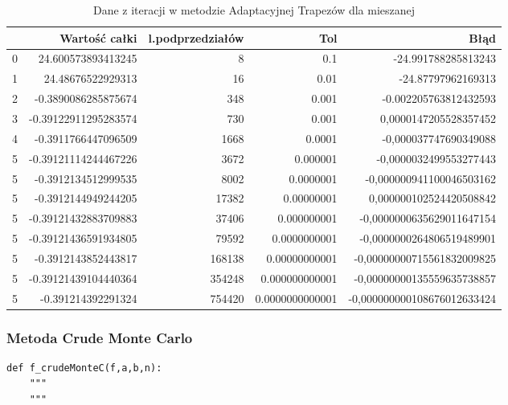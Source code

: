 \documentclass[12pt,twoside]{article}
\begin{document}
\begin{table}[H]
\centering 
\caption{Dane z iteracji w metodzie Adaptacyjnej Trapezów dla mieszanej}
\label{tabela5.3}
\begin{tabular}{lrrrr}
\toprule
{} &  Wartość całki &  l.podprzedziałów &  Tol &      Błąd \\
\midrule
0 &       24.600573893413245 &  8  &   0.1 & -24.991788285813243 \\
1 &       24.48676522929313 &  16 &   0.01 & -24.87797962169313 \\
2 &       -0.3890086285875674 &  348  &  0.001 & -0.002205763812432593 \\
3 &       -0.39122911295283574 &  730  &  0.001  & 0,0000147205528357452 \\
4 &       -0.3911766447096509 &  1668  &  0.0001  & -0,000037747690349088 \\
5 &       -0.39121114244467226 &  3672  &  0.000001  & -0,0000032499553277443 \\
5 &       -0.3912134512999535 &  8002  &  0.0000001  & -0,000000941100046503162 \\
5 &       -0.3912144949244205 &  17382  &  0.00000001  & 0,000000102524420508842 \\
5 &       -0.39121432883709883 &  37406  &  0.000000001  & -0,0000000635629011647154 \\
5 &       -0.39121436591934805 &  79592  &  0.0000000001  & -0,0000000264806519489901 \\
5 &       -0.3912143852443817 &  168138  &  0.00000000001  & -0,00000000715561832009825 \\
5 &       -0.39121439104440364 &  354248  &  0.000000000001  & -0,00000000135559635738857 \\
5 &       -0.391214392291324 &  754420  &  0.0000000000001  & -0,000000000108676012633424 \\
\bottomrule
\end{tabular}
\end{table}

\subsubsection{Metoda Crude Monte Carlo}

\begin{lstlisting}[caption={Kod w języku python implementujący metodę Crude Monte Carlo}]
def f_crudeMonteC(f,a,b,n):
    """
    """
\end{lstlisting}
\label{Listing 11}
\end{document}

